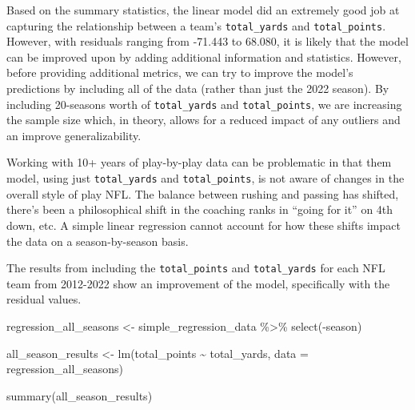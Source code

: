 \documentclass[
  letterpaper,
]{krantz}
\newenvironment{Shaded}{\begin{snugshade}}{\end{snugshade}}
\newcommand{\AttributeTok}[1]{\textcolor[rgb]{0.40,0.45,0.13}{#1}}
\newcommand{\FunctionTok}[1]{\textcolor[rgb]{0.28,0.35,0.67}{#1}}
\newcommand{\NormalTok}[1]{\textcolor[rgb]{0.00,0.23,0.31}{#1}}
\newcommand{\OtherTok}[1]{\textcolor[rgb]{0.00,0.23,0.31}{#1}}
\newcommand{\SpecialCharTok}[1]{\textcolor[rgb]{0.37,0.37,0.37}{#1}}
\begin{document}
Based on the summary statistics, the linear model did an extremely good
job at capturing the relationship between a team's \texttt{total\_yards}
and \texttt{total\_points}. However, with residuals ranging from -71.443
to 68.080, it is likely that the model can be improved upon by adding
additional information and statistics. However, before providing
additional metrics, we can try to improve the model's predictions by
including all of the data (rather than just the 2022 season). By
including 20-seasons worth of \texttt{total\_yards} and
\texttt{total\_points}, we are increasing the sample size which, in
theory, allows for a reduced impact of any outliers and an improve
generalizability.

\begin{tcolorbox}[enhanced jigsaw, left=2mm, toprule=.15mm, opacitybacktitle=0.6, leftrule=.75mm, bottomrule=.15mm, colbacktitle=quarto-callout-important-color!10!white, breakable, colback=white, bottomtitle=1mm, toptitle=1mm, title=\textcolor{quarto-callout-important-color}{\faExclamation}\hspace{0.5em}{Important}, coltitle=black, titlerule=0mm, arc=.35mm, opacityback=0, colframe=quarto-callout-important-color-frame, rightrule=.15mm]

Working with 10+ years of play-by-play data can be problematic in that
them model, using just \texttt{total\_yards} and \texttt{total\_points},
is not aware of changes in the overall style of play NFL. The balance
between rushing and passing has shifted, there's been a philosophical
shift in the coaching ranks in ``going for it'' on 4th down, etc. A
simple linear regression cannot account for how these shifts impact the
data on a season-by-season basis.

\end{tcolorbox}

The results from including the \texttt{total\_points} and
\texttt{total\_yards} for each NFL team from 2012-2022 show an
improvement of the model, specifically with the residual values.

\begin{Shaded}
\begin{Highlighting}[]
\NormalTok{regression\_all\_seasons }\OtherTok{\textless{}{-}}\NormalTok{ simple\_regression\_data }\SpecialCharTok{\%\textgreater{}\%}
  \FunctionTok{select}\NormalTok{(}\SpecialCharTok{{-}}\NormalTok{season)}

\NormalTok{all\_season\_results }\OtherTok{\textless{}{-}} \FunctionTok{lm}\NormalTok{(total\_points }\SpecialCharTok{\textasciitilde{}}\NormalTok{ total\_yards,}
                         \AttributeTok{data =}\NormalTok{ regression\_all\_seasons)}

\FunctionTok{summary}\NormalTok{(all\_season\_results)}
\end{Highlighting}
\end{Shaded}
\end{document}
